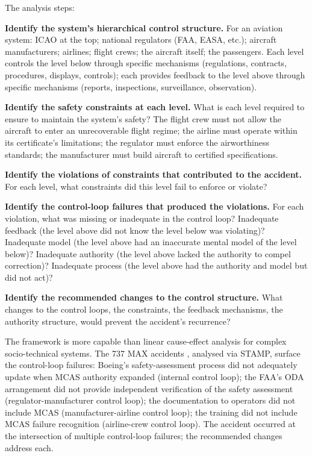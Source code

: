 The analysis steps:

\textbf{Identify the system's hierarchical control structure.} For an aviation system: ICAO at the top; national regulators (FAA, EASA, etc.); aircraft manufacturers; airlines; flight crews; the aircraft itself; the passengers. Each level controls the level below through specific mechanisms (regulations, contracts, procedures, displays, controls); each provides feedback to the level above through specific mechanisms (reports, inspections, surveillance, observation).

\textbf{Identify the safety constraints at each level.} What is each level required to ensure to maintain the system's safety? The flight crew must not allow the aircraft to enter an unrecoverable flight regime; the airline must operate within its certificate's limitations; the regulator must enforce the airworthiness standards; the manufacturer must build aircraft to certified specifications.

\textbf{Identify the violations of constraints that contributed to the accident.} For each level, what constraints did this level fail to enforce or violate?

\textbf{Identify the control-loop failures that produced the violations.} For each violation, what was missing or inadequate in the control loop? Inadequate feedback (the level above did not know the level below was violating)? Inadequate model (the level above had an inaccurate mental model of the level below)? Inadequate authority (the level above lacked the authority to compel correction)? Inadequate process (the level above had the authority and model but did not act)?

\textbf{Identify the recommended changes to the control structure.} What changes to the control loops, the constraints, the feedback mechanisms, the authority structure, would prevent the accident's recurrence?

The framework is more capable than linear cause-effect analysis for complex socio-technical systems. The 737 MAX accidents \cite{acc:house-737max-2020}, analysed via STAMP, surface the control-loop failures: Boeing's safety-assessment process did not adequately update when MCAS authority expanded (internal control loop); the FAA's ODA arrangement did not provide independent verification of the safety assessment (regulator-manufacturer control loop); the documentation to operators did not include MCAS (manufacturer-airline control loop); the training did not include MCAS failure recognition (airline-crew control loop). The accident occurred at the intersection of multiple control-loop failures; the recommended changes address each.

